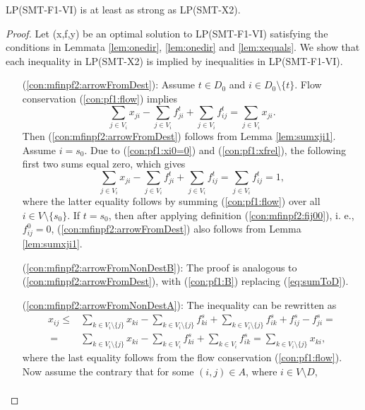 \begin{prop}
\label{prop:f1strx2}
LP(SMT-F1-VI) is at least as strong as LP(SMT-X2). 
\end{prop}
\begin{proof}
Let (x,f,y) be an optimal solution to LP(SMT-F1-VI) satisfying the conditions in Lemmata \ref{lem:onedir}, \ref{lem:onedir} and \ref{lem:xequals}. We show that each inequality in LP(SMT-X2) is implied by inequalities in LP(SMT-F1-VI).

\begin{itemize}[leftmargin=1cm]
\item[ (\ref{con:mfinpf2:arrowFromDest}):] Assume $t\in D_0$ and $i\in D_0\setminus\{t\}$. Flow conservation (\ref{con:pf1:flow}) implies
$$\sum_{j\in V_i}x_{ji} - \sum_{j\in V_i}f_{ji}^t + \sum_{j\in V_i}f_{ij}^t = \sum_{j\in V_i}x_{ji}.$$ Then (\ref{con:mfinpf2:arrowFromDest}) follows from Lemma \ref{lem:sumxji1}.
Assume $i=s_0$. Due to (\ref{con:pf1:xi0=0}) and (\ref{con:pf1:xfrel}), the following first two sums equal zero, which gives
$$\sum_{j\in V_i}x_{ji} - \sum_{j\in V_i}f_{ji}^t + \sum_{j\in V_i}f_{ij}^t = \sum_{j\in V_i}f_{ij}^t = 1,$$
where the latter equality follows by summing (\ref{con:pf1:flow}) over all $i\in V\setminus\{s_0\}$. If $t=s_0$, then after applying definition (\ref{con:mfinpf2:fij00}), i. e., $f^0_{ij}=0$, (\ref{con:mfinpf2:arrowFromDest})  also follows from Lemma \ref{lem:sumxji1}. 
\item[ (\ref{con:mfinpf2:arrowFromNonDestB}):] The proof is analogous to (\ref{con:mfinpf2:arrowFromDest}), with (\ref{con:pf1:B}) replacing (\ref{eq:sumToD}).
\item[ (\ref{con:mfinpf2:arrowFromNonDestA}):] The inequality can be rewritten as
\begin{align*}
 x_{ij}  \leq& \sum\limits_{k \in V_i\setminus\{j\}}x_{ki}-\sum\limits_{k \in V_i\setminus\{j\}}f^s_{ki}+\sum\limits_{k \in V_i\setminus\{j\}}f^s_{ik} +f^s_{ij}-f^s_{ji} = \\
 ~=& \sum\limits_{k \in V_i\setminus\{j\}}x_{ki}-\sum\limits_{k \in V_i}f^s_{ki}+\sum\limits_{k \in V_i}f^s_{ik} = \sum\limits_{k \in V_i\setminus\{j\}}x_{ki},
\end{align*}
where the last equality follows from the flow conservation (\ref{con:pf1:flow}). Now assume the contrary that for some $(i,j)\in A$, where $i\in V\setminus D$,
\begin{align}

\end{align}
\end{itemize}
\end{proof}
